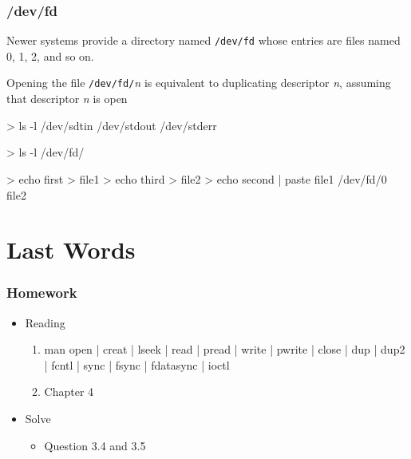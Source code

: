 \documentclass[newPxFont,sthlmFooter,nooffset]{beamer}
\begin{document}
\begin{frame}[containsverbatim,t]
  \frametitle{/dev/fd}
Newer systems provide a directory named \texttt{/dev/fd} whose entries are files named 0, 1, 2, and so on.

Opening the file \texttt{/dev/fd/}\textit{n} is equivalent to duplicating descriptor \textit{n}, assuming that descriptor \textit{n} is open
\bigskip

\begin{codedef}
> ls -l /dev/sdtin /dev/stdout /dev/stderr

> ls -l /dev/fd/

> echo first > file1
> echo third > file2
> echo second | paste file1 /dev/fd/0 file2
\end{codedef}

\end{frame}

\section{Last Words}
\begin{frame}[containsverbatim,t]
  \frametitle{Homework}
  \begin{itemize}
  \item Reading
    \begin{enumerate}[ ]
    \item 
      \begin{sthlmLatex}
man { open | creat | lseek | read | pread | write | pwrite | close | dup | dup2 | fcntl | sync | fsync | fdatasync | ioctl }
      \end{sthlmLatex}

    \item Chapter 4
    \end{enumerate}
  \item Solve
    \begin{itemize}
    \item Question 3.4 and 3.5
    \end{itemize}
  \end{itemize}
\end{frame}
\end{document}
